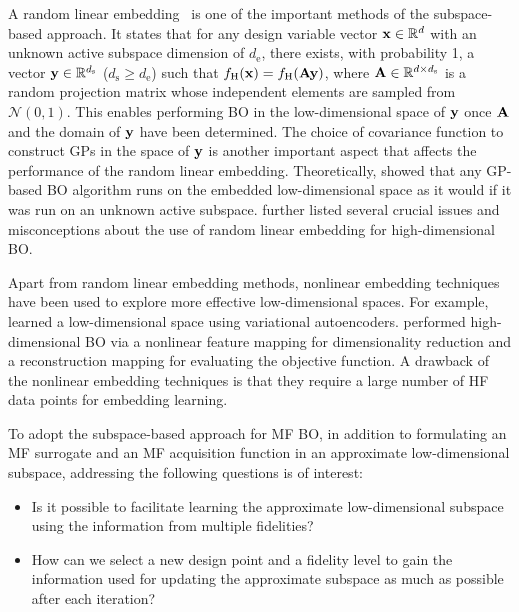 \documentclass[iicol,sn-basic]{sn-jnl}%
\begin{document}
A random linear embedding~\citep{WangZ2016} is one of the important methods of the subspace-based approach.
It states that for any design variable vector ${\bf x} \in \mathbb{R}^d$ with an unknown active subspace dimension of $d_\text{e}$, there exists, with probability 1, a vector ${\bf y} \in \mathbb{R}^{d_\text{s}}$ ($d_\text{s} \geq d_\text{e}$) such that $f_\text{H}({\bf x}) = f_\text{H}({\bf Ay})$, where ${\bf A} \in \mathbb{R}^{d \times d_\text{s}}$ is a random projection matrix whose independent elements are sampled from $\mathcal{N}(0,1)$.
This enables performing BO in the low-dimensional space of ${\bf y}$ once ${\bf A}$ and the domain of ${\bf y}$ have been determined.
The choice of covariance function to construct GPs in the space of ${\bf y}$ is another important aspect that affects the performance of the random linear embedding. 
Theoretically, \cite{Nayebi2019} showed that any GP-based BO algorithm runs on the embedded low-dimensional space as it would if it was run on an unknown active subspace.
\cite{Letham2020} further listed several crucial issues and misconceptions about the use of random linear embedding for high-dimensional BO.

Apart from random linear embedding methods, nonlinear embedding techniques have been used to explore more effective low-dimensional spaces.
For example, \cite{GomezBombarelli2018} learned a low-dimensional space using variational autoencoders.
\cite{Moriconi2020} performed high-dimensional BO via a nonlinear feature mapping for dimensionality reduction and a reconstruction mapping for evaluating the objective function. 
A drawback of the nonlinear embedding techniques is that they require a large number of HF data points for embedding learning.

To adopt the subspace-based approach for MF BO, in addition to formulating an MF surrogate and an MF acquisition function in an approximate low-dimensional subspace, addressing the following questions is of interest: 
\begin{itemize}
	\item Is it possible to facilitate learning the approximate low-dimensional subspace using the information from multiple fidelities?
	
	\item How can we select a new design point and a fidelity level to gain the information used for updating the approximate subspace as much as possible after each iteration?
\end{itemize}
\end{document}
